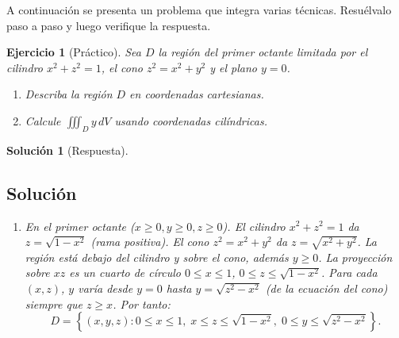 \documentclass[12pt,spanish]{article}
\newtheorem{ejercicio}{Ejercicio}[section]
\newtheorem{solucion}{Solución}
\begin{document}
A continuación se presenta un problema que integra varias técnicas. Resuélvalo paso a paso y luego verifique la respuesta.

\begin{ejercicio}[Práctico]
Sea $D$ la región del primer octante limitada por el cilindro $x^2+z^2=1$, el cono $z^2=x^2+y^2$ y el plano $y=0$.
\begin{enumerate}[label=\alph*)]
\item Describa la región $D$ en coordenadas cartesianas.
\item Calcule $\displaystyle\iiint_D y\,dV$ usando coordenadas cilíndricas.
\end{enumerate}
\end{ejercicio}

\begin{solucion}[Respuesta]
\subsection*{Solución}
\begin{enumerate}[label=\alph*)]
\item En el primer octante ($x\ge0,y\ge0,z\ge0$). El cilindro $x^2+z^2=1$ da $z=\sqrt{1-x^2}$ (rama positiva). El cono $z^2=x^2+y^2$ da $z=\sqrt{x^2+y^2}$. La región está debajo del cilindro y sobre el cono, además $y\ge0$. La proyección sobre $xz$ es un cuarto de círculo $0\le x\le1$, $0\le z\le\sqrt{1-x^2}$. Para cada $(x,z)$, $y$ varía desde $y=0$ hasta $y=\sqrt{z^2-x^2}$ (de la ecuación del cono) siempre que $z\ge x$. Por tanto:
\[
D = \left\{(x,y,z): 0\le x\le1,\; x\le z\le\sqrt{1-x^2},\; 0\le y\le\sqrt{z^2-x^2}\right\}.
\]


\end{enumerate}
\end{solucion}
\end{document}
